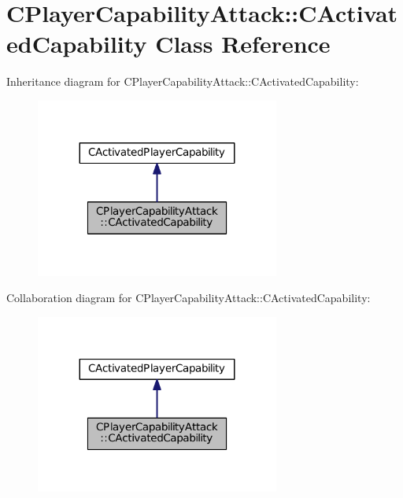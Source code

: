 \hypertarget{classCPlayerCapabilityAttack_1_1CActivatedCapability}{}\section{C\+Player\+Capability\+Attack\+:\+:C\+Activated\+Capability Class Reference}
\label{classCPlayerCapabilityAttack_1_1CActivatedCapability}


Inheritance diagram for C\+Player\+Capability\+Attack\+:\+:C\+Activated\+Capability\+:
\nopagebreak
\begin{figure}[H]
\begin{center}
\leavevmode
\includegraphics[width=227pt]{classCPlayerCapabilityAttack_1_1CActivatedCapability__inherit__graph}
\end{center}
\end{figure}


Collaboration diagram for C\+Player\+Capability\+Attack\+:\+:C\+Activated\+Capability\+:
\nopagebreak
\begin{figure}[H]
\begin{center}
\leavevmode
\includegraphics[width=227pt]{classCPlayerCapabilityAttack_1_1CActivatedCapability__coll__graph}
\end{center}
\end{figure}
